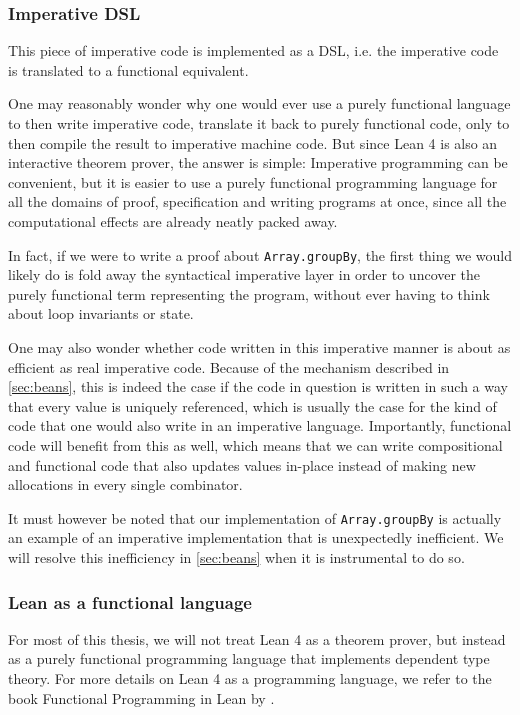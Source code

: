 \subsubsection{Imperative DSL}
This piece of imperative code is implemented as a DSL, i.e. the imperative code is translated to a functional equivalent.

One may reasonably wonder why one would ever use a purely functional language to then write imperative code, translate it back to purely functional code, only to then compile the result to imperative machine code. But since Lean 4 is also an interactive theorem prover, the answer is simple: Imperative programming can be convenient, but it is easier to use a purely functional programming language for all the domains of proof, specification and writing programs at once, since all the computational effects are already neatly packed away. 

In fact, if we were to write a proof about \lstinline|Array.groupBy|, the first thing we would likely do is fold away the syntactical imperative layer in order to uncover the purely functional term representing the program, without ever having to think about loop invariants or state.

One may also wonder whether code written in this imperative manner is about as efficient as real imperative code. Because of the mechanism described in \cref{sec:beans}, this is indeed the case if the code in question is written in such a way that every value is uniquely referenced, which is usually the case for the kind of code that one would also write in an imperative language. Importantly, functional code will benefit from this as well, which means that we can write compositional and functional code that also updates values in-place instead of making new allocations in every single combinator. 

It must however be noted that our implementation of \lstinline|Array.groupBy| is actually an example of an imperative implementation that is unexpectedly inefficient. We will resolve this inefficiency in \cref{sec:beans} when it is instrumental to do so.

\subsubsection{Lean as a functional language}

For most of this thesis, we will not treat Lean 4 as a theorem prover, but instead as a purely functional programming language that implements dependent type theory. For more details on Lean 4 as a programming language, we refer to the book Functional Programming in Lean by \cite{christiansen_functional_2023}.

